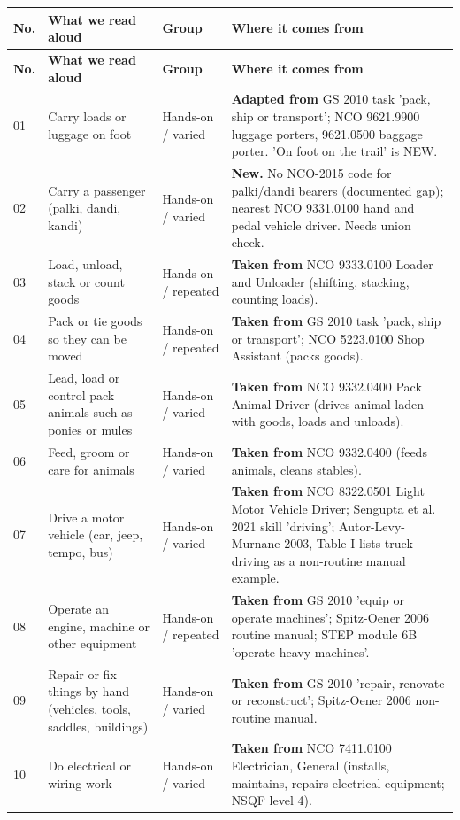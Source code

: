 \documentclass[11pt]{article}
\begin{document}
{\footnotesize
\begin{longtable}{p{0.7cm}p{4.2cm}p{2.7cm}p{6.9cm}}
\toprule
\textbf{No.} & \textbf{What we read aloud} & \textbf{Group} & \textbf{Where it comes from} \\
\midrule
\endfirsthead
\toprule
\textbf{No.} & \textbf{What we read aloud} & \textbf{Group} & \textbf{Where it comes from} \\
\midrule
\endhead
01 & Carry loads or luggage on foot & Hands-on / varied & \textbf{Adapted from} GS 2010 task 'pack, ship or transport'; NCO 9621.9900 luggage porters, 9621.0500 baggage porter. 'On foot on the trail' is NEW. \\
02 & Carry a passenger (palki, dandi, kandi) & Hands-on / varied & \textbf{New.} No NCO-2015 code for palki/dandi bearers (documented gap); nearest NCO 9331.0100 hand and pedal vehicle driver. Needs union check. \\
03 & Load, unload, stack or count goods & Hands-on / repeated & \textbf{Taken from} NCO 9333.0100 Loader and Unloader (shifting, stacking, counting loads). \\
04 & Pack or tie goods so they can be moved & Hands-on / repeated & \textbf{Taken from} GS 2010 task 'pack, ship or transport'; NCO 5223.0100 Shop Assistant (packs goods). \\
05 & Lead, load or control pack animals such as ponies or mules & Hands-on / varied & \textbf{Taken from} NCO 9332.0400 Pack Animal Driver (drives animal laden with goods, loads and unloads). \\
06 & Feed, groom or care for animals & Hands-on / varied & \textbf{Taken from} NCO 9332.0400 (feeds animals, cleans stables). \\
07 & Drive a motor vehicle (car, jeep, tempo, bus) & Hands-on / varied & \textbf{Taken from} NCO 8322.0501 Light Motor Vehicle Driver; Sengupta et al. 2021 skill 'driving'; Autor-Levy-Murnane 2003, Table I lists truck driving as a non-routine manual example. \\
08 & Operate an engine, machine or other equipment & Hands-on / repeated & \textbf{Taken from} GS 2010 'equip or operate machines'; Spitz-Oener 2006 routine manual; STEP module 6B 'operate heavy machines'. \\
09 & Repair or fix things by hand (vehicles, tools, saddles, buildings) & Hands-on / varied & \textbf{Taken from} GS 2010 'repair, renovate or reconstruct'; Spitz-Oener 2006 non-routine manual. \\
10 & Do electrical or wiring work & Hands-on / varied & \textbf{Taken from} NCO 7411.0100 Electrician, General (installs, maintains, repairs electrical equipment; NSQF level 4). \\

\end{longtable}}
\end{document}
